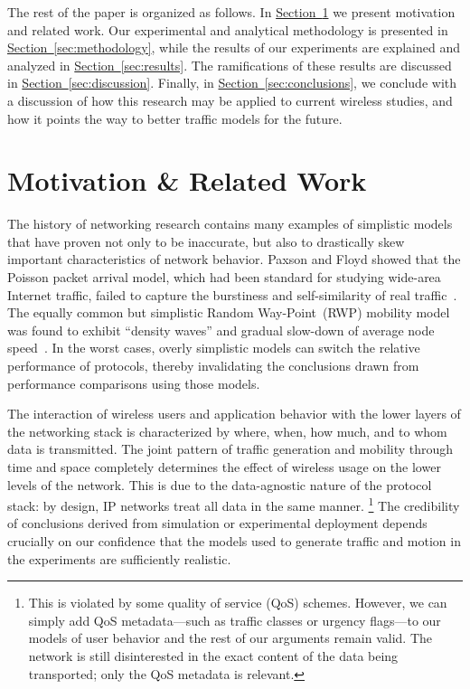 \documentclass[conference]{IEEEtran}
\newcommand{\caps}[1]{{\small{#1}}}
\newcommand{\Section}[1]{\hyperref[sec:#1]{Section~\ref*{sec:#1}}}
\begin{document}
The rest of the paper is organized as follows. In \Section{motivation} we present motivation and related work. Our experimental and analytical methodology is presented in \Section{methodology}, while the results of our experiments are explained and analyzed in \Section{results}. The ramifications of these results are discussed in \Section{discussion}. Finally, in \Section{conclusions}, we conclude with a discussion of how this research may be applied to current wireless studies, and how it points the way to better traffic models for the future.

\section{Motivation \& Related Work}\label{sec:motivation}\label{sec:related-work}

The history of networking research contains many examples of simplistic models that have proven not only to be inaccurate, but also to drastically skew important characteristics of network behavior. Paxson and Floyd showed that the Poisson packet arrival model, which had been standard for studying wide-area Internet traffic, failed to capture the burstiness and self-similarity of real traffic~\cite{Paxson95}. The equally common but simplistic Random Way-Point~(\caps{RWP}) mobility model was found to exhibit ``density waves'' and gradual slow-down of average node speed~\cite{Royer01,Yoon03:speed-decay}. In the worst cases, overly simplistic models can switch the relative performance of protocols, thereby invalidating the conclusions drawn from performance comparisons using those models.

The interaction of wireless users and application behavior with the lower layers of the networking stack is characterized by where, when, how much, and to whom data is transmitted. The joint pattern of traffic generation and mobility through time and space completely determines the effect of wireless usage on the lower levels of the network. This is due to the data-agnostic nature of the protocol stack: by design, \caps{IP} networks treat all data in the same manner.%
\footnote{This is violated by some quality of service (QoS) schemes. However, we can simply add QoS metadata---such as traffic classes or urgency flags---to our models of user behavior and the rest of our arguments remain valid. The network is still disinterested in the exact content of the data being transported; only the QoS metadata is relevant.} The credibility of conclusions derived from simulation or experimental deployment depends crucially on our confidence that the models used to generate traffic and motion in the experiments are sufficiently realistic.
\end{document}

